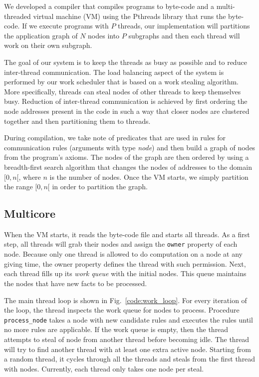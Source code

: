 
We developed a compiler that compiles programs to byte-code and a multi-threaded
virtual machine (VM) using the Pthreads library that runs the byte-code.
If we execute programs with $P$ threads, our implementation will partitions the application
graph of $N$ nodes into $P$ subgraphs and then each thread will work on their own subgraph.

The goal of our system is to keep the threads as busy as possible and to reduce inter-thread communication.
The load balancing aspect of the system is performed by our work scheduler that is based on a work
stealing algorithm. More specifically, threads can steal nodes of other threads to keep themselves busy.
Reduction of inter-thread communication is achieved by first ordering the node addresses present
in the code in such a way that closer nodes are clustered together and then partitioning them
to threads.

During compilation, we take note of predicates that are used in rules for
communication rules (arguments with type \emph{node}) and then build a graph of nodes from
the program's axioms. The nodes of the graph are then ordered by using a breadth-first search
algorithm that changes the nodes of addresses to the domain $[0, n[$, where $n$ is the number of
nodes. Once the VM starts, we simply partition the range
$[0, n[$ in order to partition the graph.

\subsection{Multicore}

When the VM starts, it reads the byte-code file and starts all threads.
As a first step, all threads will grab their nodes and assign the \texttt{owner} property of each node.
Because only one thread is allowed to do computation on a node at any giving time, the owner property
defines the thread with such permission.
Next, each thread fills up its \emph{work queue} with the initial nodes. This queue
maintains the nodes that have new facts to be processed.

The main thread loop is shown in Fig.~\ref{code:work_loop}. For every iteration of the loop, the thread inspects the work queue
for nodes to process. Procedure \texttt{process\_node} takes a node with new candidate rules and executes the rules until no more
rules are applicable. If the work queue is empty, then the thread attempts to steal of node from another thread before
becoming idle. The thread will try to find another
thread with at least one extra active node. Starting from a random thread, it cycles through all the threads
and steals from the first thread with nodes. Currently, each thread only takes one node per steal.

